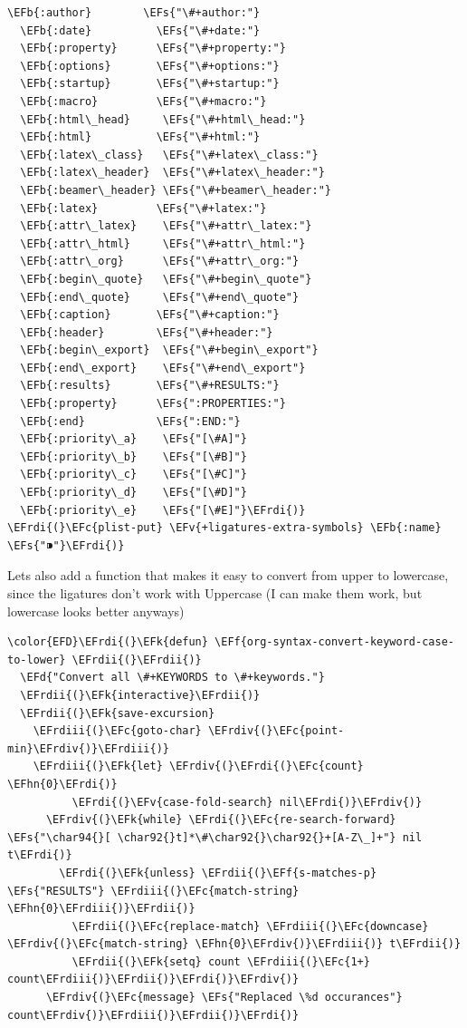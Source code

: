 \documentclass{scrartcl}
\newcommand{\EFk}[1]{\textcolor{EFk}{#1}} %
\newcommand{\EFd}[1]{\textcolor{EFd}{\textit{#1}}} %
\newcommand{\EFs}[1]{\textcolor{EFs}{#1}} %
\newcommand{\EFb}[1]{\textcolor{EFb}{#1}} %
\newcommand{\EFc}[1]{\textcolor{EFc}{#1}} %
\newcommand{\EFv}[1]{\textcolor{EFv}{#1}} %
\newcommand{\EFf}[1]{\textcolor{EFf}{#1}} %
\newcommand{\EFhn}[1]{\textcolor{EFhn}{\textbf{#1}}} %
\newcommand{\EFrdi}[1]{\textcolor{EFrdi}{#1}} %
\newcommand{\EFrdii}[1]{\textcolor{EFrdii}{#1}} %
\newcommand{\EFrdiii}[1]{\textcolor{EFrdiii}{#1}} %
\newcommand{\EFrdiv}[1]{\textcolor{EFrdiv}{#1}} %
\begin{document}
\begin{Code}
\begin{Verbatim}[]
  \EFb{:author}        \EFs{"\#+author:"}
  \EFb{:date}          \EFs{"\#+date:"}
  \EFb{:property}      \EFs{"\#+property:"}
  \EFb{:options}       \EFs{"\#+options:"}
  \EFb{:startup}       \EFs{"\#+startup:"}
  \EFb{:macro}         \EFs{"\#+macro:"}
  \EFb{:html\_head}     \EFs{"\#+html\_head:"}
  \EFb{:html}          \EFs{"\#+html:"}
  \EFb{:latex\_class}   \EFs{"\#+latex\_class:"}
  \EFb{:latex\_header}  \EFs{"\#+latex\_header:"}
  \EFb{:beamer\_header} \EFs{"\#+beamer\_header:"}
  \EFb{:latex}         \EFs{"\#+latex:"}
  \EFb{:attr\_latex}    \EFs{"\#+attr\_latex:"}
  \EFb{:attr\_html}     \EFs{"\#+attr\_html:"}
  \EFb{:attr\_org}      \EFs{"\#+attr\_org:"}
  \EFb{:begin\_quote}   \EFs{"\#+begin\_quote"}
  \EFb{:end\_quote}     \EFs{"\#+end\_quote"}
  \EFb{:caption}       \EFs{"\#+caption:"}
  \EFb{:header}        \EFs{"\#+header:"}
  \EFb{:begin\_export}  \EFs{"\#+begin\_export"}
  \EFb{:end\_export}    \EFs{"\#+end\_export"}
  \EFb{:results}       \EFs{"\#+RESULTS:"}
  \EFb{:property}      \EFs{":PROPERTIES:"}
  \EFb{:end}           \EFs{":END:"}
  \EFb{:priority\_a}    \EFs{"[\#A]"}
  \EFb{:priority\_b}    \EFs{"[\#B]"}
  \EFb{:priority\_c}    \EFs{"[\#C]"}
  \EFb{:priority\_d}    \EFs{"[\#D]"}
  \EFb{:priority\_e}    \EFs{"[\#E]"}\EFrdi{)}
\EFrdi{(}\EFc{plist-put} \EFv{+ligatures-extra-symbols} \EFb{:name} \EFs{"⁍"}\EFrdi{)}
\end{Verbatim}
\end{Code}

Lets also add a function that makes it easy to convert from upper to lowercase,
since the ligatures don't work with Uppercase (I can make them work, but
lowercase looks better anyways)
\begin{Code}
\begin{Verbatim}[]
\color{EFD}\EFrdi{(}\EFk{defun} \EFf{org-syntax-convert-keyword-case-to-lower} \EFrdii{(}\EFrdii{)}
  \EFd{"Convert all \#+KEYWORDS to \#+keywords."}
  \EFrdii{(}\EFk{interactive}\EFrdii{)}
  \EFrdii{(}\EFk{save-excursion}
    \EFrdiii{(}\EFc{goto-char} \EFrdiv{(}\EFc{point-min}\EFrdiv{)}\EFrdiii{)}
    \EFrdiii{(}\EFk{let} \EFrdiv{(}\EFrdi{(}\EFc{count} \EFhn{0}\EFrdi{)}
          \EFrdi{(}\EFv{case-fold-search} nil\EFrdi{)}\EFrdiv{)}
      \EFrdiv{(}\EFk{while} \EFrdi{(}\EFc{re-search-forward} \EFs{"\char94{}[ \char92{}t]*\#\char92{}\char92{}+[A-Z\_]+"} nil t\EFrdi{)}
        \EFrdi{(}\EFk{unless} \EFrdii{(}\EFf{s-matches-p} \EFs{"RESULTS"} \EFrdiii{(}\EFc{match-string} \EFhn{0}\EFrdiii{)}\EFrdii{)}
          \EFrdii{(}\EFc{replace-match} \EFrdiii{(}\EFc{downcase} \EFrdiv{(}\EFc{match-string} \EFhn{0}\EFrdiv{)}\EFrdiii{)} t\EFrdii{)}
          \EFrdii{(}\EFk{setq} count \EFrdiii{(}\EFc{1+} count\EFrdiii{)}\EFrdii{)}\EFrdi{)}\EFrdiv{)}
      \EFrdiv{(}\EFc{message} \EFs{"Replaced \%d occurances"} count\EFrdiv{)}\EFrdiii{)}\EFrdii{)}\EFrdi{)}
\end{Verbatim}
\end{Code}
\end{document}
